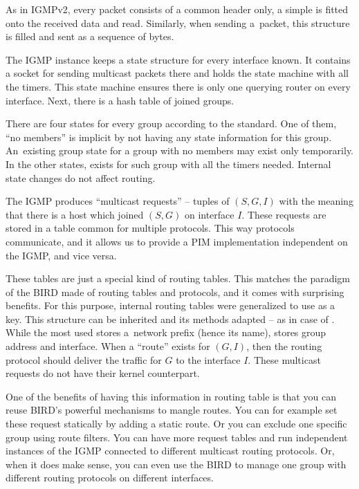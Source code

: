 As in IGMPv2, every packet consists of a common header only, a simple
 is fitted onto the received data and read. Similarly,
when sending a~packet, this structure is filled and sent as a sequence of bytes.

The IGMP instance keeps a state structure  for every
interface known. It contains a socket for sending multicast packets there and holds
the state machine with all the timers. This state machine ensures there is only
one querying router on every interface. Next, there is a hash table of joined
groups.

There are four states for every group according to the standard. One of them,
``no members'' is implicit by not having any state information for this group.
An~existing group state for a group with no members may exist only temporarily.
In the other states,  exists for such group with all
the timers needed. Internal state changes do not affect routing.

The IGMP produces ``multicast requests'' -- tuples of $(S, G, I)$ with the
meaning that there is a host which joined $(S, G)$ on interface $I$. These
requests are stored in a table common for multiple protocols. This way
protocols communicate, and it allows us to provide a PIM implementation
independent on the IGMP, and vice versa.

These tables are just a special kind of routing tables. This matches the
paradigm of the BIRD made of routing tables and protocols, and it comes with
surprising benefits. For this purpose, internal routing tables were generalized
to use  as a key. This structure can be inherited and
its methods adapted -- as in case of . While the most
used  stores a~network prefix (hence its name),
 stores group address and interface. When a ``route''
exists for $(G, I)$, then the routing protocol should deliver the traffic for
$G$ to the interface $I$. These multicast requests do not have their kernel
counterpart.

One of the benefits of having this information in routing table is that you can
reuse BIRD's powerful mechanisms to mangle routes. You can for example set
these request statically by adding a static route. Or you can exclude one
specific group using route filters. You can have more request tables and run
independent instances of the IGMP connected to different multicast routing
protocols. Or, when it does make sense, you can even use the BIRD to manage one
group with different routing protocols on different interfaces.

